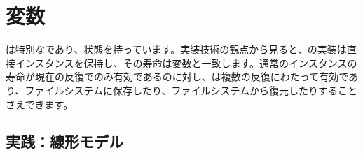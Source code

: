 \begin{savequote}[45mm]
\end{savequote}

\chapter{変数} 
\label{ch:variable}

\begin{content}

は特別なであり、状態を持っています。実装技術の観点から見ると、の実装は直接インスタンスを保持し、その寿命は変数と一致します。通常のインスタンスの寿命が現在の反復でのみ有効であるのに対し、は複数の反復にわたって有効であり、ファイルシステムに保存したり、ファイルシステムから復元したりすることさえできます。

\end{content}

\section{実践：線形モデル}

